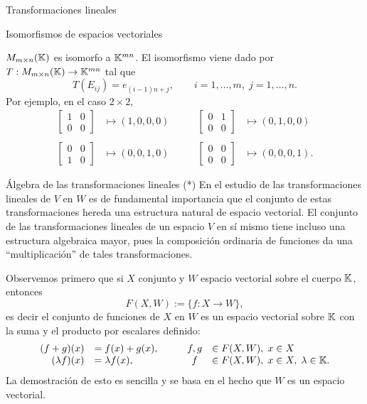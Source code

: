 \begin{chapter}{Transformaciones lineales}
\begin{section}{Isomorfismos de espacios vectoriales}
    \begin{ejemplo*} $M_{m \times n}(\mathbb K)$  es isomorfo a $\mathbb K^{mn}$. El isomorfismo viene dado por $T: M_{m \times n}(\mathbb K) \to \mathbb K^{mn}$ tal que
        $$
        T(E_{ij}) = e_{(i-1)n+j}, \qquad i=1,\ldots, m,\; j=1,\ldots, n.
        $$
    Por  ejemplo, en el caso  $2 \times 2$,
    \begin{equation*}
    \begin{array}{llll}
    \begin{bmatrix} 1&0\\0&0\end{bmatrix} &\mapsto (1,0,0,0) \qquad&
    \begin{bmatrix} 0&1\\0&0\end{bmatrix} &\mapsto (0,1,0,0) \\
    &&&\\
    \begin{bmatrix} 0&0\\1&0\end{bmatrix} &\mapsto (0,0,1,0) &
    \begin{bmatrix} 0&0\\0&0\end{bmatrix} &\mapsto (0,0,0,1).
    \end{array}
    \end{equation*}	 
        
    \end{ejemplo*}
    
        \end{section}
    
        \begin{section}{\'Algebra de las transformaciones lineales (*)}\label{seccion-algebra-de-las-transformaciones-lineales}
            En el estudio de las transformaciones lineales de $V$ en $W$ es de fundamental importancia que el conjunto de estas transformaciones hereda una estructura natural de espacio vectorial. El conjunto de las transformaciones lineales de un espacio $V$ en sí mismo tiene incluso una estructura algebraica mayor, pues la composición ordinaria de funciones da una ``multiplicación'' de tales transformaciones. 
            
            
            Observemos primero que si $X$ conjunto y $W$ espacio vectorial sobre el cuerpo $\mathbb K$,  entonces
            $$
            F(X,W) := \{f:X\to W\},
            $$ 
            es decir el conjunto de funciones de $X$ en $W$ es un espacio vectorial sobre $\mathbb K$ con la suma y el producto por escalares definido:
            \begin{equation*}
            \begin{array}{rlcl}
            (f+g)(x) &= f(x)+ g(x),\qquad &f,g& \in F(X,W),\; x \in X\\
            (\lambda f)(x) &= \lambda f(x), & f& \in F(X,W),\; x \in X, \; \lambda \in \mathbb K.
            \end{array}
            \end{equation*}
            La demostración de esto es sencilla y se basa en el hecho que $W$  es un espacio vectorial. 
            

\end{section}
\end{chapter}
